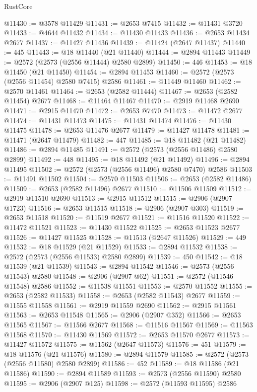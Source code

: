 \begin{lexlean}{RustCore}
\begin{coremodule}
@11430 := @3578 @11429
@11431 := @2653 @7415
@11432 := @11431 @3720
@11433 := @4644 @11432
@11434 := @11430 @11433
@11436 := @2653 @11434 @2677
@11437 := @11427 @11436
@11439 := @11424 (@2647 @11437)
@11440 := 445
@11443 := @18 @11440 (@21 @11440)
@11444 := @2894 @11443
@11449 := @2572 (@2573 (@2556 @11444) @2580 @2899)
@11450 := 446
@11453 := @18 @11450 (@21 @11450)
@11454 := @2894 @11453
@11460 := @2572 (@2573 (@2556 @11454) @2580 @7415) @2586
@11461 := @11449 @11460
@11462 := @2570 @11461
@11464 := @2653 (@2582 @11444)
@11467 := @2653 (@2582 @11454) @2677
@11468 := @11464 @11467
@11470 := @2919 @11468 @2690
@11471 := @2915 @11470
@11472 := @2653 @7470
@11473 := @11472 @2677
@11474 := @11431 @11473
@11475 := @11431 @11474
@11476 := @11430 @11475
@11478 := @2653 @11476 @2677
@11479 := @11427 @11478
@11481 := @11471 (@2647 @11479)
@11482 := 447
@11485 := @18 @11482 (@21 @11482)
@11486 := @2894 @11485
@11491 := @2572 (@2573 (@2556 @11486) @2580 @2899)
@11492 := 448
@11495 := @18 @11492 (@21 @11492)
@11496 := @2894 @11495
@11502 := @2572 (@2573 (@2556 @11496) @2580 @7470) @2586
@11503 := @11491 @11502
@11504 := @2570 @11503
@11506 := @2653 (@2582 @11486)
@11509 := @2653 (@2582 @11496) @2677
@11510 := @11506 @11509
@11512 := @2919 @11510 @2690
@11513 := @2915 @11512
@11515 := @2906 (@2907 @1723)
@11516 := @2653 @11515
@11518 := @2906 (@2907 @303)
@11519 := @2653 @11518
@11520 := @11519 @2677
@11521 := @11516 @11520
@11522 := @11472 @11521
@11523 := @11430 @11522
@11525 := @2653 @11523 @2677
@11526 := @11427 @11525
@11528 := @11513 (@2647 @11526)
@11529 := 449
@11532 := @18 @11529 (@21 @11529)
@11533 := @2894 @11532
@11538 := @2572 (@2573 (@2556 @11533) @2580 @2899)
@11539 := 450
@11542 := @18 @11539 (@21 @11539)
@11543 := @2894 @11542
@11546 := @2573 (@2556 @11543) @2580
@11548 := @2906 (@2907 @62)
@11551 := @2572 (@11546 @11548) @2586
@11552 := @11538 @11551
@11553 := @2570 @11552
@11555 := @2653 (@2582 @11533)
@11558 := @2653 (@2582 @11543) @2677
@11559 := @11555 @11558
@11561 := @2919 @11559 @2690
@11562 := @2915 @11561
@11563 := @2653 @11548
@11565 := @2906 (@2907 @352)
@11566 := @2653 @11565
@11567 := @11566 @2677
@11568 := @11516 @11567
@11569 := @11563 @11568
@11570 := @11430 @11569
@11572 := @2653 @11570 @2677
@11573 := @11427 @11572
@11575 := @11562 (@2647 @11573)
@11576 := 451
@11579 := @18 @11576 (@21 @11576)
@11580 := @2894 @11579
@11585 := @2572 (@2573 (@2556 @11580) @2580 @2899)
@11586 := 452
@11589 := @18 @11586 (@21 @11586)
@11590 := @2894 @11589
@11593 := @2573 (@2556 @11590) @2580
@11595 := @2906 (@2907 @125)
@11598 := @2572 (@11593 @11595) @2586

\end{coremodule}
\end{lexlean}
